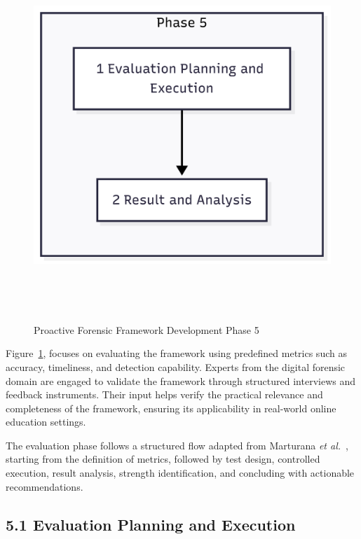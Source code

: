 \begin{figure}[H]
    \centering
    \includegraphics[height=14cm]{figure/framework-development-phase-5.png}
    \caption{Proactive Forensic Framework Development Phase 5}
    \label{fig:framework-development-phase-5}
\end{figure}

Figure~\ref{fig:framework-development-phase-5}, focuses on evaluating the framework using predefined metrics such as accuracy, timeliness, and detection capability. Experts from the digital forensic domain are engaged to validate the framework through structured interviews and feedback instruments. Their input helps verify the practical relevance and completeness of the framework, ensuring its applicability in real-world online education settings.

The evaluation phase follows a structured flow adapted from Marturana \textit{et al.}~\cite{marturana2020evaluation}, starting from the definition of metrics, followed by test design, controlled execution, result analysis, strength identification, and concluding with actionable recommendations.
\subsection{5.1 Evaluation Planning and Execution}

